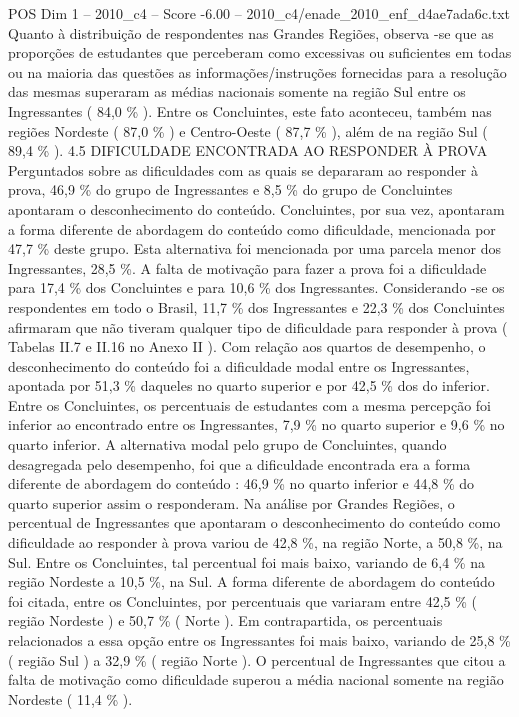 \begin{textsample}{POS Dim 1 – 2010\_c4 – Score -6.00 – 2010\_c4/enade\_2010\_enf\_d4ae7ada6c.txt}
Quanto à distribuição de respondentes nas Grandes Regiões, observa -se que as proporções de estudantes que perceberam como excessivas ou suficientes em todas ou na maioria das questões as informações/instruções fornecidas para a resolução das mesmas superaram as médias nacionais somente na região Sul entre os Ingressantes ( 84,0 \% ).
Entre os Concluintes, este fato aconteceu, também nas regiões Nordeste ( 87,0 \% ) e Centro-Oeste ( 87,7 \% ), além de na região Sul ( 89,4 \% ). 4.5 DIFICULDADE ENCONTRADA AO RESPONDER À PROVA Perguntados sobre as dificuldades com as quais se depararam ao responder à prova, 46,9 \% do grupo de Ingressantes e 8,5 \% do grupo de Concluintes apontaram o desconhecimento do conteúdo.
Concluintes, por sua vez, apontaram a forma diferente de abordagem do conteúdo como dificuldade, mencionada por 47,7 \% deste grupo.
Esta alternativa foi mencionada por uma parcela menor dos Ingressantes, 28,5 \%.
A falta de motivação para fazer a prova foi a dificuldade para 17,4 \% dos Concluintes e para 10,6 \% dos Ingressantes.
Considerando -se os respondentes em todo o Brasil, 11,7 \% dos Ingressantes e 22,3 \% dos Concluintes afirmaram que não tiveram qualquer tipo de dificuldade para responder à prova ( Tabelas II.7 e II.16 no Anexo II ).
Com relação aos quartos de desempenho, o desconhecimento do conteúdo foi a dificuldade modal entre os Ingressantes, apontada por 51,3 \% daqueles no quarto superior e por 42,5 \% dos do inferior.
Entre os Concluintes, os percentuais de estudantes com a mesma percepção foi inferior ao encontrado entre os Ingressantes, 7,9 \% no quarto superior e 9,6 \% no quarto inferior.
A alternativa modal pelo grupo de Concluintes, quando desagregada pelo desempenho, foi que a dificuldade encontrada era a forma diferente de abordagem do conteúdo : 46,9 \% no quarto inferior e 44,8 \% do quarto superior assim o responderam.
Na análise por Grandes Regiões, o percentual de Ingressantes que apontaram o desconhecimento do conteúdo como dificuldade ao responder à prova variou de 42,8 \%, na região Norte, a 50,8 \%, na Sul.
Entre os Concluintes, tal percentual foi mais baixo, variando de 6,4 \% na região Nordeste a 10,5 \%, na Sul.
A forma diferente de abordagem do conteúdo foi citada, entre os Concluintes, por percentuais que variaram entre 42,5 \% ( região Nordeste ) e 50,7 \% ( Norte ).
Em contrapartida, os percentuais relacionados a essa opção entre os Ingressantes foi mais baixo, variando de 25,8 \% ( região Sul ) a 32,9 \% ( região Norte ).
O percentual de Ingressantes que citou a falta de motivação como dificuldade superou a média nacional somente na região Nordeste ( 11,4 \% ).

\end{textsample}
